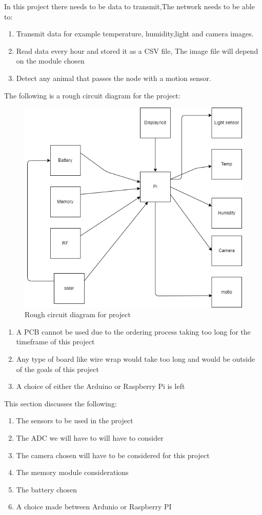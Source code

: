 In this project there needs to be data to transmit,The network needs to be able to:
\begin{enumerate}
	\item Transmit  data for  example  temperature, humidity,light and camera images.
	\item Read data every hour  and  stored it as a CSV file, The image file  will depend on the module chosen
	\item Detect  any animal that passes  the  node with a motion sensor. 
\end{enumerate}
\newpage
The following is  a  rough circuit diagram  for the project:
\begin{figure}[h!]
	\centering
	\includegraphics[width=0.5\linewidth]{Images/block_diagram_for_mesh_device.png}
	\caption{Rough circuit diagram for project}
	\label{Rough circuit diagram for project}
\end{figure}
\begin{enumerate}
	\item A PCB cannot be used due to  the ordering process taking too long for the timeframe of this project 
	\item Any  type of board like wire wrap  would take too long and would be outside of  the  goals of this project
	\item A  choice of either the  Arduino or Raspberry Pi is left
\end{enumerate}
This section discusses the following:
\begin{enumerate}
	\item The sensors to be used in the project
	\item The ADC we will have  to will have to  consider
	\item The camera chosen will have to be  considered  for this project
	\item The memory module considerations
	\item The battery chosen
	\item A choice made between Ardunio or Raspberry PI
\end{enumerate}

